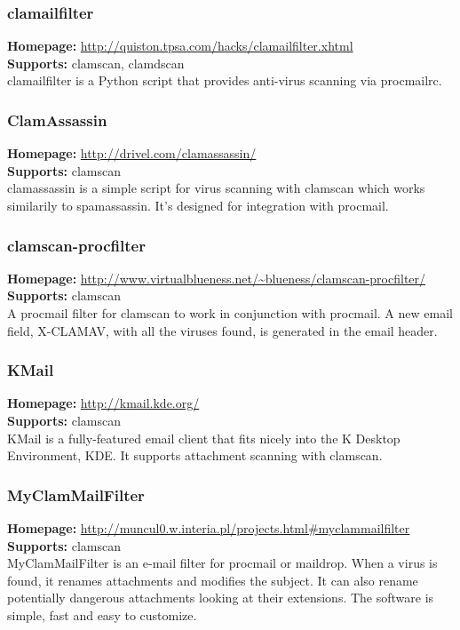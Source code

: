 \documentclass[a4paper,titlepage,12pt]{article}
\begin{document}
    \subsubsection{clamailfilter}
    \textbf{Homepage:} \url{http://quiston.tpsa.com/hacks/clamailfilter.xhtml}\\
    \textbf{Supports:} clamscan, clamdscan\\[4pt]
    clamailfilter is a Python script that provides anti-virus scanning via
    procmailrc.

    \subsubsection{ClamAssassin}
    \textbf{Homepage:} \url{http://drivel.com/clamassassin/}\\
    \textbf{Supports:} clamscan\\[4pt]
     clamassassin is a simple script for virus scanning with clamscan which
     works similarily to spamassassin. It's designed for integration with
     procmail.

    \subsubsection{clamscan-procfilter}
    \textbf{Homepage:} \url{http://www.virtualblueness.net/~blueness/clamscan-procfilter/}\\
    \textbf{Supports:} clamscan\\[4pt]
    A procmail filter for clamscan to work in conjunction with procmail.
    A new email field, X-CLAMAV, with all the viruses found, is generated in
    the email header.                       

    \subsubsection{KMail}
    \textbf{Homepage:} \url{http://kmail.kde.org/}\\
    \textbf{Supports:} clamscan\\[4pt]
    KMail is a fully-featured email client that fits nicely into the K Desktop
    Environment, KDE. It supports attachment scanning with clamscan.

    \subsubsection{MyClamMailFilter}
    \textbf{Homepage:} \url{http://muncul0.w.interia.pl/projects.html#myclammailfilter}\\
    \textbf{Supports:} clamscan\\[4pt]
    MyClamMailFilter is an e-mail filter for procmail or maildrop.
    When a virus is found, it renames attachments and modifies the subject.
    It can also rename potentially dangerous attachments looking at their
    extensions. The software is simple, fast and easy to customize.
\end{document}
